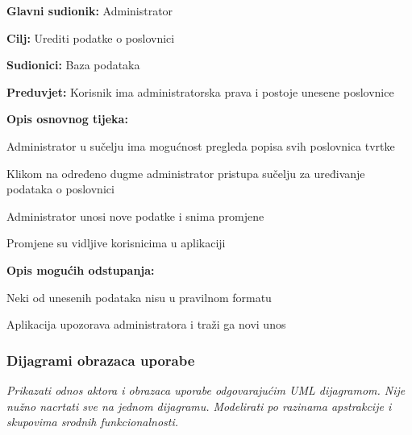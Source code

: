 					\noindent {}
					\begin{packed_item}
	
						\item \textbf{Glavni sudionik: }Administrator
						\item  \textbf{Cilj: }Urediti podatke o poslovnici
						\item  \textbf{Sudionici: }Baza podataka
						\item  \textbf{Preduvjet: }Korisnik ima administratorska prava i postoje unesene poslovnice
						\item  \textbf{Opis osnovnog tijeka:}
						
						\item[] \begin{packed_enum}
							\item Administrator u sučelju ima mogućnost pregleda popisa svih poslovnica tvrtke
							\item Klikom na određeno dugme administrator pristupa sučelju za uređivanje podataka o poslovnici
							\item Administrator unosi nove podatke i snima promjene
							\item Promjene su vidljive korisnicima u aplikaciji
						\end{packed_enum}
						
						\item  \textbf{Opis mogućih odstupanja: }
						
						\item[] \begin{packed_item}
	
							\item[3.a] Neki od unesenih podataka nisu u pravilnom formatu
							\item[] \begin{packed_enum}
								\item Aplikacija upozorava administratora i traži ga novi unos
							\end{packed_enum}
						\end{packed_item}
						
					\end{packed_item}
				
				\eject
				\subsubsection{Dijagrami obrazaca uporabe}
					
					\textit{Prikazati odnos aktora i obrazaca uporabe odgovarajućim UML dijagramom. Nije nužno nacrtati sve na jednom dijagramu. Modelirati po razinama apstrakcije i skupovima srodnih funkcionalnosti.}
						
